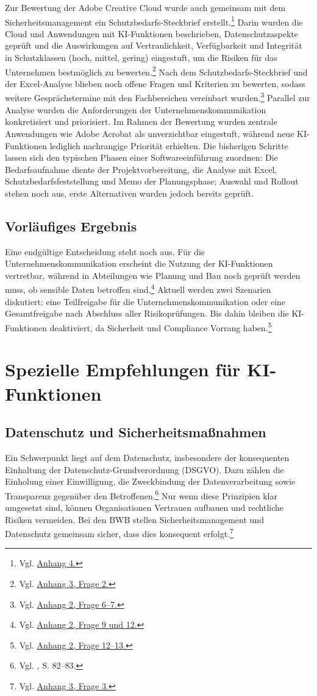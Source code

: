 \documentclass[
    12pt, 
    a4paper,
    ]{scrartcl} %
\begin{document}
Zur Bewertung der Adobe Creative Cloud wurde auch gemeinsam mit dem Sicherheitsmanagement ein Schutzbedarfs-Steckbrief erstellt.\footnote{Vgl. \hyperref[sec:Anhang4]{Anhang 4.}} Darin wurden die Cloud und Anwendungen mit KI-Funktionen beschrieben, Datenschutzaspekte geprüft und die Auswirkungen auf Vertraulichkeit, Verfügbarkeit und Integrität in Schutzklassen (hoch, mittel, gering) eingestuft, um die Risiken für das Unternehmen bestmöglich zu bewerten.\footnote{Vgl. \hyperref[sec:Anhang3]{Anhang 3, Frage 2.}} Nach dem Schutzbedarfs-Steckbrief und der Excel-Analyse blieben noch offene Fragen und Kriterien zu bewerten, sodass weitere Gesprächstermine mit den Fachbereichen vereinbart wurden.\footnote{Vgl. \hyperref[sec:Anhang2]{Anhang 2, Frage 6--7.}}
Parallel zur Analyse wurden die Anforderungen der Unternehmenskommunikation konkretisiert und priorisiert.
Im Rahmen der Bewertung wurden zentrale Anwendungen wie Adobe Acrobat als unverzichtbar eingestuft, während neue KI-Funktionen lediglich nachrangige Priorität erhielten. Die bisherigen Schritte lassen sich den typischen Phasen einer Softwareeinführung zuordnen: Die Bedarfsaufnahme diente der Projektvorbereitung, die Analyse mit Excel, Schutzbedarfsfeststellung und Memo der Planungsphase; Auswahl und Rollout stehen noch aus, erste Alternativen wurden jedoch bereits geprüft.
\subsection{Vorläufiges Ergebnis}

Eine endgültige Entscheidung steht noch aus. Für die Unternehmenskommunikation erscheint die Nutzung der KI-Funktionen vertretbar, während in Abteilungen wie Planung und Bau noch geprüft werden muss, ob sensible Daten betroffen sind.\footnote{Vgl. \hyperref[sec:Anhang2]{Anhang 2, Frage 9 und 12.}} Aktuell werden zwei Szenarien diskutiert: eine Teilfreigabe für die Unternehmenskommunikation oder eine Gesamtfreigabe nach Abschluss aller Risikoprüfungen. Bis dahin bleiben die KI-Funktionen deaktiviert, da Sicherheit und Compliance Vorrang haben.\footnote{Vgl. \hyperref[sec:Anhang2]{Anhang 2, Frage 12--13.}}

\section{Spezielle Empfehlungen für KI-Funktionen}

\subsection{Datenschutz und Sicherheitsmaßnahmen}
Ein Schwerpunkt liegt auf dem Datenschutz, insbesondere der konsequenten Einhaltung der Datenschutz-Grundverordnung (DSGVO). Dazu zählen die Einholung einer Einwilligung, die Zweckbindung der Datenverarbeitung sowie Transparenz gegenüber den Betroffenen.\footnote{Vgl. \cite{S_Fabarius2023}, S. 82–83.}  Nur wenn diese Prinzipien klar umgesetzt sind, können Organisationen Vertrauen aufbauen und rechtliche Risiken vermeiden. Bei den BWB stellen Sicherheitsmanagement und Datenschutz gemeinsam sicher, dass dies konsequent erfolgt.\footnote{Vgl. \hyperref[sec:Anhang3]{Anhang 3, Frage 3.}}
\end{document}
